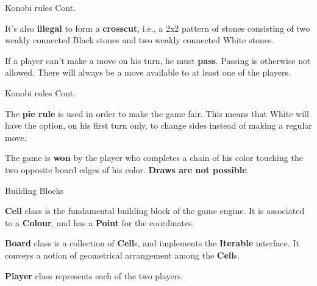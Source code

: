 \documentclass{beamer}
\begin{document}
  \begin{frame}{Konobi rules Cont.}

    It's also \textbf{illegal} to form a \textbf{crosscut}, i.e., a 2x2 pattern of stones consisting of two weakly connected Black stones and two weakly connected White stones.

    \vspace{1em}

    \begin{centering}


    \end{centering}\pause

    \vspace{1em}

    If a player can't make a move on his turn, he must \textbf{pass}. Passing is otherwise not allowed. There will always be a move available to at least one of the players.

  \end{frame}


  \begin{frame}{Konobi rules Cont.}

    The \textbf{pie rule} is used in order to make the game fair. This means that White will have the option, on his first turn only, to change sides instead of making a regular move.\pause

    \vspace{3em}

    The game is \textbf{won} by the player who completes a chain of his color touching the two opposite board edges of his color. \textbf{Draws are not possible}.

  \end{frame}


  \begin{frame}{Building Blocks}

    \textbf{Cell} class is the fundamental building block of the game engine. It is associated to a \textbf{Colour}, and has a \textbf{Point} for the coordinates.

    \vspace{1em}

    \textbf{Board} class is a collection of \textbf{Cell}s, and implements the \textbf{Iterable} interface. It conveys a notion of geometrical arrangement among the \textbf{Cell}s.

    \vspace{1em}

    \textbf{Player} class represents each of the two players.

    \end{frame}
\end{document}

